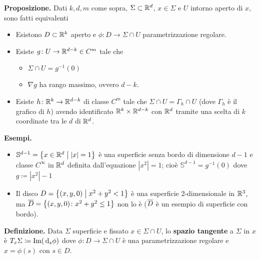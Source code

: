 \textbf{Proposizione.} Dati $k,d,m$ come sopra, $\Sigma \subset \mathbb R^d$, $x \in \Sigma$ e $U$ intorno aperto di $x$, sono fatti equivalenti
\begin{itemize}

	\item Esistono $D \subset \mathbb R^k$ aperto e $\phi \colon D \to \Sigma \cap U$ parametrizzazione regolare.


	\item Esiste $g \colon U \to \mathbb R^{d-k} \in C^m$ tale che 
	\begin{itemize}

		\item $\Sigma \cap U = g^{-1}(0)$

		\item $\nabla g$ ha rango massimo, ovvero $d-k$.

	\end{itemize}


	\item Esiste $h \colon \mathbb R^k \to \mathbb R^{d-k}$ di classe $C^m$ tale che $\Sigma \cap U = \Gamma_h \cap U$ (dove $\Gamma_h$ è il grafico di $h$) avendo identificato $\mathbb R^k \times \mathbb R^{d-k}$ con $\mathbb R^d$ tramite una scelta di $k$ coordinate tra le $d$ di $\mathbb R^d$.

\end{itemize}

\textbf{Esempi.}
\begin{itemize}

	\item $\mathbb{S}^{d-1} = \left\{ x \in \mathbb R^d \;\middle|\; |x| = 1 \right\}$ è una superficie senza bordo di dimensione $d-1$ e classe $C^\infty$ in $\mathbb R^d$ definita dall'equazione $|x^2|=1$; cioè $\mathbb{S}^{d-1} = g^{-1}(0)$ dove $g \coloneqq |x^2| - 1$


	\item Il disco $D = \left\{ (x,y,0) \;\middle|\; x^2 + y^2 < 1 \right\}$ è una superficie 2-dimensionale in $\mathbb R^3$, ma $\overline{D} = \left\{ (x,y,0) \colon x^2 + y^2 \leq 1 \right\}$ non lo è ($\overline{D}$ è un esempio di superficie con bordo).

\end{itemize}

\vss

\textbf{Definizione.} Data $\Sigma$ superficie e fissato $x \in \Sigma \cap U$, lo \textbf{spazio tangente} a $\Sigma$ in $x$ è $ T_x \Sigma \coloneqq \operatorname{Im} (\,\mathrm{d}_s \phi)$ dove $\phi \colon D \to \Sigma \cap U$ è una parametrizzazione regolare e $x = \phi(s)$ con $s \in D$.

